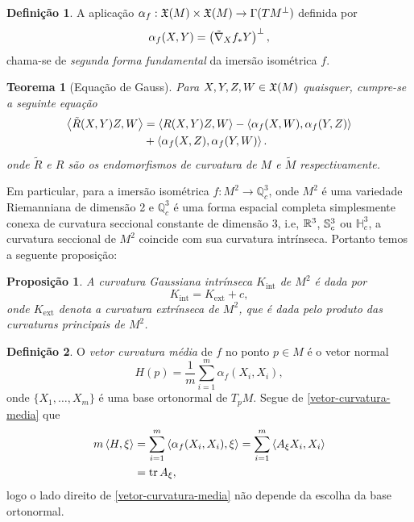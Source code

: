 \documentclass[12pt,a4paper]{beamer}
\newtheorem{teorema}{Teorema}
\newtheorem{proposicao}{Proposição}
\theoremstyle{definition}
\newtheorem{definicao}{Definição}
\begin{document}
\begin{frame}[allowframebreaks]
	
	\begin{definicao}
		A aplicação $\alpha_f: \mathfrak{X}(M) \times \mathfrak{X}(M) \rightarrow \Gamma(TM^\perp)$ definida por
		\begin{equation*}
		\alpha_f(X,Y) = \left( \tilde{\nabla}_X f_* Y \right)^\perp,
		\end{equation*}
		chama-se de \emph{segunda forma fundamental} da imersão isométrica $f$.
	\end{definicao}
	
	\begin{teorema}[Equação de Gauss]
		Para $X,Y,Z,W \in \mathfrak{X}(M)$ quaisquer, cumpre-se a seguinte equação
		\begin{align*}
			\left\langle \tilde{R}(X,Y)Z,W \right\rangle &= \left\langle R(X,Y)Z,W \right\rangle - \left\langle \alpha_f(X,W),\alpha_f(Y,Z) \right\rangle\\
			&+ \left\langle \alpha_f(X,Z),\alpha_f(Y,W) \right\rangle.
		\end{align*}
		onde $\tilde{R}$ e $R$ são os endomorfismos de curvatura de $M$ e $\tilde{M}$ respectivamente.
	\end{teorema}

	Em particular, para a imersão isométrica $f: M^2 \rightarrow \mathbb{Q}^3_c$, onde $M^2$ é uma variedade Riemanniana de dimensão 2 e $\mathbb{Q}^3_c$ é uma forma espacial completa simplesmente conexa de curvatura seccional constante de dimensão 3, i.e, $\mathbb R^3$, $\mathbb{S}^3_c$ ou $\mathbb{H}^3_c$, a curvatura seccional de $M^2$ coincide com sua curvatura intrínseca. Portanto temos a seguente proposição:

	\begin{proposicao}
		A curvatura Gaussiana intrínseca $K_{\text{int}}$ de $M^2$ é dada por
		\begin{equation*}
			K_{\text{int}} = K_{\text{ext}} + c,
		\end{equation*}
		onde $K_{\text{ext}}$ denota a curvatura extrínseca de $M^2$, que é dada pelo produto das curvaturas principais de $M^2$.
	\end{proposicao}

	\begin{definicao}
		O \emph{vetor curvatura média} de $f$ no ponto $p \in M$ é o vetor normal
		\begin{equation}\label{vetor-curvatura-media}
		H(p) = \frac{1}{m} \sum_{i=1}^m \alpha_f(X_i,X_i),
		\end{equation}
		onde $\{X_1, \ldots, X_m \}$ é uma base ortonormal de $T_p M$. Segue de \eqref{vetor-curvatura-media} que
		\begin{align*}
		m \left\langle H,\xi \right\rangle &= \sum_{i=1}^m \left\langle \alpha_f(X_i,X_i),\xi \right\rangle = \sum_{i=1}^m \left\langle A_{\xi} X_i,X_i \right\rangle\\
		&= \operatorname{tr} A_{\xi},
		\end{align*}
		logo o lado direito de \eqref{vetor-curvatura-media} não depende da escolha da base ortonormal.
	\end{definicao}


\end{frame}
\end{document}
